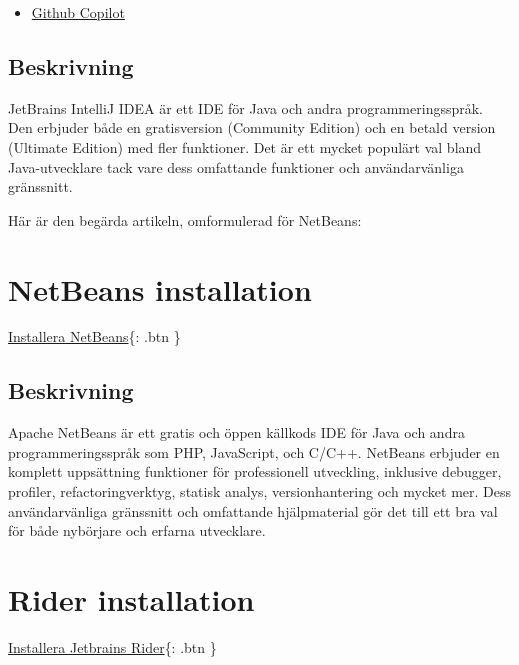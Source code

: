 \begin{itemize}
\tightlist
\item
  \href{https://plugins.jetbrains.com/plugin/17718-github-copilot}{Github
  Copilot}
\end{itemize}

\hypertarget{beskrivning}{%
\subsection{Beskrivning}\label{beskrivning}}

JetBrains IntelliJ IDEA är ett IDE för Java och andra
programmeringsspråk. Den erbjuder både en gratisversion (Community
Edition) och en betald version (Ultimate Edition) med fler funktioner.
Det är ett mycket populärt val bland Java-utvecklare tack vare dess
omfattande funktioner och användarvänliga gränssnitt.

Här är den begärda artikeln, omformulerad för NetBeans:

\hypertarget{netbeans-installation}{%
\section{NetBeans installation}\label{netbeans-installation}}

\href{https://netbeans.apache.org/download/index.html}{Installera
NetBeans}\{: .btn \}

\hypertarget{beskrivning}{%
\subsection{Beskrivning}\label{beskrivning}}

Apache NetBeans är ett gratis och öppen källkods IDE för Java och andra
programmeringsspråk som PHP, JavaScript, och C/C++. NetBeans erbjuder en
komplett uppsättning funktioner för professionell utveckling, inklusive
debugger, profiler, refactoringverktyg, statisk analys, versionhantering
och mycket mer. Dess användarvänliga gränssnitt och omfattande
hjälpmaterial gör det till ett bra val för både nybörjare och erfarna
utvecklare.

\hypertarget{rider-installation}{%
\section{Rider installation}\label{rider-installation}}

\href{https://www.jetbrains.com/rider/}{Installera Jetbrains Rider}\{:
.btn \}

